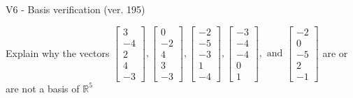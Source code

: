 \begin{exercise}
  \begin{exerciseTitle}V6 - Basis verification (ver. 195)\end{exerciseTitle}
  \begin{exerciseStatement}
    Explain why the vectors \(\left[\begin{array}{r}
3 \\
-4 \\
2 \\
4 \\
-3
\end{array}\right] , \left[\begin{array}{r}
0 \\
-2 \\
4 \\
3 \\
-3
\end{array}\right] , \left[\begin{array}{r}
-2 \\
-5 \\
-3 \\
1 \\
-4
\end{array}\right] , \left[\begin{array}{r}
-3 \\
-4 \\
-4 \\
0 \\
1
\end{array}\right] , \text{ and } \left[\begin{array}{r}
-2 \\
0 \\
-5 \\
2 \\
-1
\end{array}\right]\) are or are not a basis of \(\mathbb{R}^5\)	



\end{exerciseStatement}
\end{exercise}
